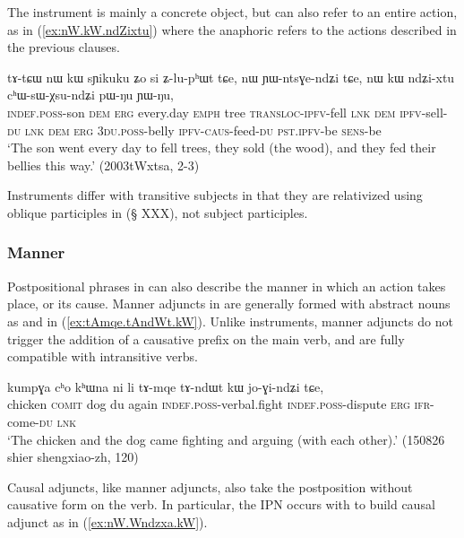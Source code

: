 The instrument is mainly a concrete object, but can also refer to an entire action, as in (\ref{ex:nW.kW.ndZixtu}) where the anaphoric  refers to the actions described in the previous clauses.

\begin{exe}
\ex \label{ex:nW.kW.ndZixtu}
 \gll tɤ-tɕɯ nɯ kɯ sɲikuku ʑo si ʑ-lu-pʰɯt tɕe, nɯ ɲɯ-ntsɣe-ndʑi tɕe,  nɯ kɯ ndʑi-xtu cʰɯ-sɯ-χsu-ndʑi pɯ-ŋu ɲɯ-ŋu,  \\
 \textsc{indef}.\textsc{poss}-son \textsc{dem} \textsc{erg} every.day \textsc{emph} tree \textsc{transloc}-\textsc{ipfv}-fell \textsc{lnk} \textsc{dem} \textsc{ipfv}-sell-\textsc{du} \textsc{lnk} \textsc{dem} \textsc{erg} \textsc{3du}.\textsc{poss}-belly \textsc{ipfv}-\textsc{caus}-feed-\textsc{du} \textsc{pst}.\textsc{ipfv}-be \textsc{sens}-be \\
 \glt `The son went every day to fell trees, they sold (the wood), and they fed their bellies this way.' (2003tWxtsa, 2-3)
\end{exe}

Instruments differ with transitive subjects in that they are relativized using oblique participles in  (§ XXX), not subject participles.

\subsubsection{Manner} \label{sec:manner.nominal.kW}
Postpositional phrases in  can also describe the manner in which an action takes place, or its cause. Manner adjuncts in  are generally formed with abstract nouns as  and   in (\ref{ex:tAmqe.tAndWt.kW}). Unlike instruments, manner adjuncts do not trigger the addition of a causative prefix on the main verb, and are fully compatible with intransitive verbs.

\begin{exe}
\ex \label{ex:tAmqe.tAndWt.kW}
 \gll kumpɣa cʰo kʰɯna ni li tɤ-mqe tɤ-ndɯt kɯ jo-ɣi-ndʑi tɕe, \\
 chicken \textsc{comit} dog du again \textsc{indef}.\textsc{poss}-verbal.fight \textsc{indef}.\textsc{poss}-dispute \textsc{erg} \textsc{ifr}-come-\textsc{du} \textsc{lnk} \\
 \glt `The chicken and the dog came fighting and arguing (with each other).' (150826 shier shengxiao-zh, 120)
\end{exe}

Causal adjuncts, like manner adjuncts, also take the postposition  without causative form on the verb. In particular, the IPN  occurs with  to build causal adjunct as in (\ref{ex:nW.Wndzxa.kW}). 

